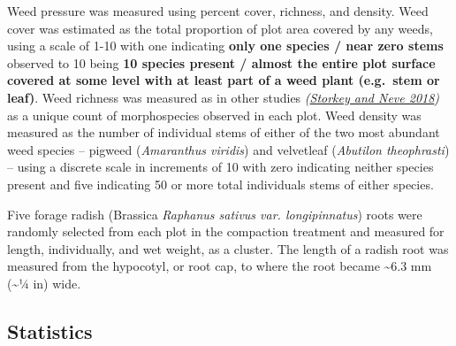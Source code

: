 \documentclass[
]{article}
\begin{document}
Weed pressure was measured using percent cover, richness, and density.
Weed cover was estimated as the total proportion of plot area covered by any weeds,
using a scale of 1-10 with one indicating \textbf{only one species / near zero stems} observed to 10 being \textbf{10 species present / almost the entire plot surface covered at some level with at least part of a weed plant (e.g.~stem or leaf)}.
Weed richness was measured as in other studies \emph{(\protect\hyperlink{ref-storkey18}{Storkey and Neve 2018})} as a unique count of morphospecies observed in each plot.
Weed density was measured as the number of individual stems of either of the two most abundant weed species -- pigweed (\emph{Amaranthus viridis}) and velvetleaf (\emph{Abutilon theophrasti}) -- using a discrete scale in increments of 10 with zero indicating neither species present and five indicating 50 or more total individuals stems of either species.

Five forage radish (Brassica \emph{Raphanus sativus var. longipinnatus}) roots were randomly selected from each plot in the compaction treatment and measured for length, individually, and wet weight, as a cluster.
The length of a radish root was measured from the hypocotyl, or root cap, to where the root became \textasciitilde6.3 mm (\textasciitilde1⁄4 in) wide.

\hypertarget{statistics}{%
\subsection{Statistics}\label{statistics}}
\end{document}
